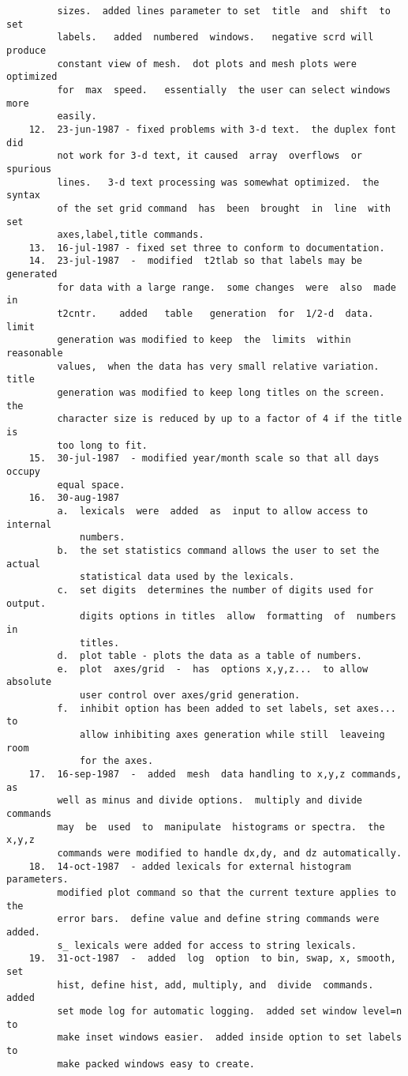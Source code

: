 \begin{verbatim}
         sizes.  added lines parameter to set  title  and  shift  to  set
         labels.   added  numbered  windows.   negative scrd will produce
         constant view of mesh.  dot plots and mesh plots were  optimized
         for  max  speed.   essentially  the user can select windows more
         easily.  
    12.  23-jun-1987 - fixed problems with 3-d text.  the duplex font did
         not work for 3-d text, it caused  array  overflows  or  spurious
         lines.   3-d text processing was somewhat optimized.  the syntax
         of the set grid command  has  been  brought  in  line  with  set
         axes,label,title commands.  
    13.  16-jul-1987 - fixed set three to conform to documentation.  
    14.  23-jul-1987  -  modified  t2tlab so that labels may be generated
         for data with a large range.  some changes  were  also  made  in
         t2cntr.    added   table   generation  for  1/2-d  data.   limit
         generation was modified to keep  the  limits  within  reasonable
         values,  when the data has very small relative variation.  title
         generation was modified to keep long titles on the screen.   the
         character size is reduced by up to a factor of 4 if the title is
         too long to fit.  
    15.  30-jul-1987  - modified year/month scale so that all days occupy
         equal space.  
    16.  30-aug-1987 
         a.  lexicals  were  added  as  input to allow access to internal
             numbers.  
         b.  the set statistics command allows the user to set the actual
             statistical data used by the lexicals.  
         c.  set digits  determines the number of digits used for output.
             digits options in titles  allow  formatting  of  numbers  in
             titles.  
         d.  plot table - plots the data as a table of numbers.  
         e.  plot  axes/grid  -  has  options x,y,z...  to allow absolute
             user control over axes/grid generation.  
         f.  inhibit option has been added to set labels, set axes...  to
             allow inhibiting axes generation while still  leaveing  room
             for the axes.  
    17.  16-sep-1987  -  added  mesh  data handling to x,y,z commands, as
         well as minus and divide options.  multiply and divide  commands
         may  be  used  to  manipulate  histograms or spectra.  the x,y,z
         commands were modified to handle dx,dy, and dz automatically.  
    18.  14-oct-1987  - added lexicals for external histogram parameters.
         modified plot command so that the current texture applies to the
         error bars.  define value and define string commands were added.
         s_ lexicals were added for access to string lexicals.  
    19.  31-oct-1987  -  added  log  option  to bin, swap, x, smooth, set
         hist, define hist, add, multiply, and  divide  commands.   added
         set mode log for automatic logging.  added set window level=n to
         make inset windows easier.  added inside option to set labels to
         make packed windows easy to create.  
\end{verbatim}

